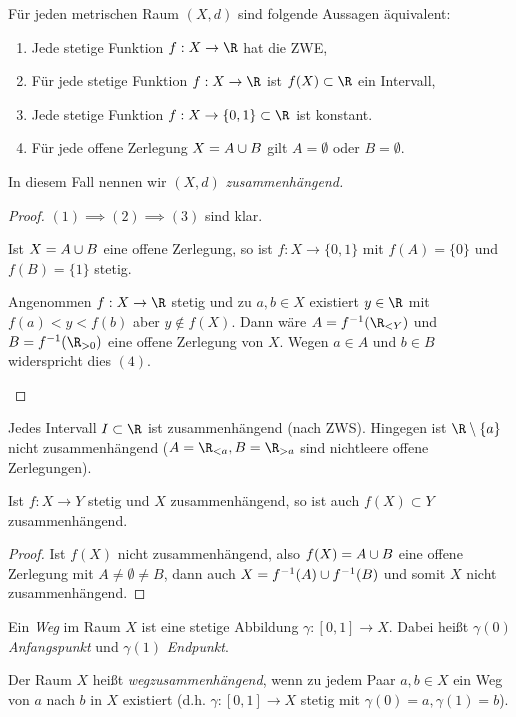 \begin{st}
	Für jeden metrischen Raum $(X,d)$ sind folgende Aussagen äquivalent:
	\begin{enumerate}[(1)]
		\item
			Jede stetige Funktion $f: X \to \R$ hat die ZWE,
		\item
			Für jede stetige Funktion $f: X \to \R$ ist $f(X) \subset \R$ ein Intervall,
		\item
			Jede stetige Funktion $f: X \to \{0,1\} \subset \R$ ist konstant.
		\item
			Für jede offene Zerlegung $X = A \cup B$ gilt $A = \emptyset$ oder $B = \emptyset$.
	\end{enumerate}
	In diesem Fall nennen wir $(X,d)$ \em{zusammenhängend}.
	\begin{proof}
		$(1) \implies (2) \implies (3)$ sind klar.
		\begin{seg}[$(3) \implies (4)$]
			Ist $X = A \cup B$ eine offene Zerlegung, so ist \oBdA $f: X \to \{0, 1\}$ mit $f(A) = \{0\}$ und $f(B) = \{1\}$ stetig.
		\end{seg}
		\begin{seg}[$(4) \implies (1)$]
			Angenommen $f: X \to \R$ stetig und zu $a,b \in X$ existiert $y \in \R$ mit $f(a) < y < f(b)$ aber $y \not\in f(X)$.
			Dann wäre $A = f^{-1}(\R_{<Y})$ und $B = f^{-1}(\R_{>0})$ eine offene Zerlegung von $X$.
			Wegen $a \in A$ und $b \in B$ widerspricht dies $(4)$.
		\end{seg}
	\end{proof}
\end{st}

\begin{ex}
	Jedes Intervall $I \subset \R$ ist zusammenhängend (nach ZWS).
	Hingegen ist $\R \setminus \{a\}$ nicht zusammenhängend ($A = \R_{<a}, B=\R_{>a}$ sind nichtleere offene Zerlegungen).
\end{ex}

\begin{st}
	Ist $f: X \to Y$ stetig und $X$ zusammenhängend, so ist auch $f(X) \subset Y$ zusammenhängend.
	\begin{proof}
		Ist $f(X)$ nicht zusammenhängend, also $f(X) = A \cup B$ eine offene Zerlegung mit $A \neq \emptyset \neq B$, dann auch $X = f^{-1}(A) \cup f^{-1}(B)$ und somit $X$ nicht zusammenhängend.
	\end{proof}
\end{st}

\begin{df}
	Ein \emph{Weg} im Raum $X$ ist eine stetige Abbildung $\gamma: [0,1] \to X$.
	Dabei heißt $\gamma(0)$ \emph{Anfangspunkt} und $\gamma(1)$ \emph{Endpunkt}.

	Der Raum $X$ heißt \emph{wegzusammenhängend}, wenn zu jedem Paar $a,b \in X$ ein Weg von $a$ nach $b$ in $X$ existiert (d.h. $\gamma:[0,1] \to X$ stetig mit $\gamma(0) = a, \gamma(1) = b$).
\end{df}

